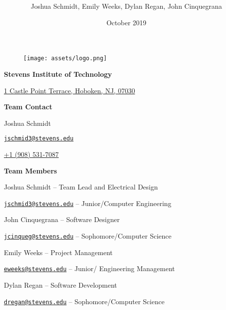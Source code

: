 \documentclass{article}
\title{
  \maintitle \\
	\large \schoolname}
\date{October 2019}
\author{Joshua Schmidt, Emily Weeks, Dylan Regan, John Cinquegrana}
\newcommand{\schoolname}{Stevens Institute of Technology}
\begin{document}
\maketitle

\bigskip
\bigskip
\bigskip
\bigskip

\begin{figure}[!htb]
  \centering
  \texttt{[image: assets/logo.png]}
  \label{fig:logo}
\end{figure}

\newpage

\begin{center}

\bigskip
\bigskip

{

\textbf{\schoolname}

\href{http://maps.google.com/?q=1+Castle+Point+Terrace,+Hoboken,+NJ,+07030}{1 Castle Point Terrace, Hoboken, NJ, 07030}

\bigskip
\bigskip

\textbf{Team Contact}

Joshua Schmidt

\href{mailto:jschmid3@stevens.edu}{\nolinkurl{jschmid3@stevens.edu}}

\href{tel:19085317087}{+1 (908) 531-7087}

\bigskip
\bigskip

\textbf{Team Members}

Joshua Schmidt -- Team Lead and Electrical Design

\href{mailto:jschmid3@stevens.edu}{\nolinkurl{jschmid3@stevens.edu}} -- Junior/Computer Engineering

\bigskip
\bigskip

John Cinquegrana -- Software Designer 

\href{mailto:jcinqueg@stevens.edu}{\nolinkurl{jcinqueg@stevens.edu}} -- Sophomore/Computer Science

\bigskip
\bigskip

Emily Weeks -- Project Management

\href{mailto:eweeks@stevens.edu}{\nolinkurl{eweeks@stevens.edu}} -- Junior/ Engineering Management

\bigskip
\bigskip

Dylan Regan -- Software Development

\href{mailto:dregan@stevens.edu}{\nolinkurl{dregan@stevens.edu}} -- Sophomore/Computer Science

\bigskip
\bigskip

}
\end{center}
\end{document}
